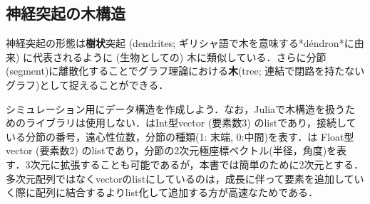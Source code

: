 \subsection{神経突起の木構造}
神経突起の形態は\textbf{樹状}突起 (dendrites; ギリシャ語で木を意味する*déndron*に由来) に代表されるように (生物としての) 木に類似している．さらに分節(segment)に離散化することでグラフ理論における\textbf{木}(tree; 連結で閉路を持たないグラフ)として捉えることができる．

シミュレーション用にデータ構造を作成しよう．なお，Juliaで木構造を扱うためのライブラリは使用しない．はInt型vector (要素数3) のlistであり，接続している分節の番号，遠心性位数，分節の種類(1: 末端, 0:中間)を表す．は Float型vector (要素数2) のlistであり，分節の2次元極座標ベクトル(半径，角度)を表す．3次元に拡張することも可能であるが，本書では簡単のために2次元とする．多次元配列ではなくvectorのlistにしているのは，成長に伴って要素を追加していく際に配列に結合するよりlist化して追加する方が高速なためである．
